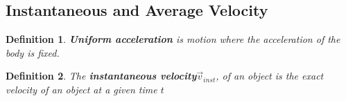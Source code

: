 \documentclass[12pt]{article}
\theoremstyle{break}
\newtheorem{defn}{Definition}[subsection]
\begin{document}
\subsection{Instantaneous and Average Velocity}
\begin{defn}
\textbf{Uniform acceleration} is motion where the acceleration of the body is fixed.
\end{defn}

\begin{defn}
The \textbf{instantaneous velocity}$\vec v_{inst}$, of an object is the \emph{exact} velocity of an object at a given time $t$
\end{defn}

	




	
\end{document}
